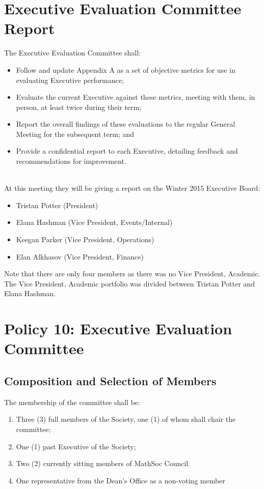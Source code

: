 \documentclass[12pt, letterpaper]{article}
\begin{document}
\newpage
{}
\section*{Executive Evaluation Committee Report}
The Executive Evaluation Committee shall:
\begin{itemize}
	\item Follow and update Appendix A as a set of objective metrics for use in evaluating Executive performance;
	\item Evaluate the current Executive against these metrics, meeting with them, in person, at least twice during their term;
	\item Report the overall findings of these evaluations to the regular General Meeting for the subsequent term;
	and
	\item Provide a confidential report to each Executive, detailing feedback and recommendations for improvement.
\end{itemize}
~\\
At this meeting they will be giving a report on the Winter 2015 Executive Board:
\begin{itemize}
	\item Tristan Potter (President)
	\item Elana Hashman (Vice President, Events/Internal)
	\item Keegan Parker (Vice President, Operations)
	\item Elan Alkhasov (Vice President, Finance)
\end{itemize}

Note that there are only four members as there was no Vice President, Academic. The Vice President, Academic portfolio was divided between Tristan Potter and Elana Hashman. 

\newpage
{}
\section*{Policy 10: Executive Evaluation Committee}

\subsection*{Composition and Selection of Members}
The membership of the committee shall be:
\begin{enumerate}
	\item Three (3) full members of the Society, one (1) of whom shall chair the committee;
	\item One (1) past Executive of the Society;
	\item Two (2) currently sitting members of MathSoc Council.
	\item One representative from the Dean’s Office as a non-voting member
\end{enumerate}
\end{document}
